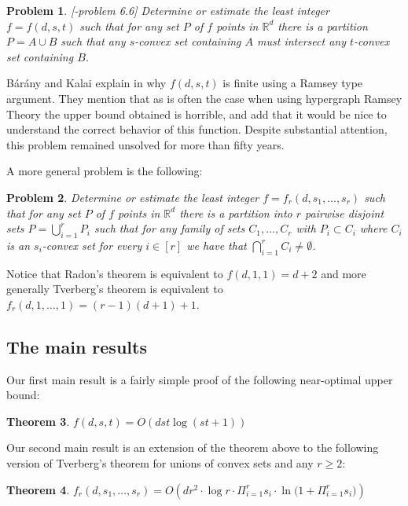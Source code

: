 \documentclass[11pt]{article}
\def\Re{\mathbb R}
\theoremstyle{plain}
\newtheorem{theorem}{Theorem}[section]
\newtheorem{problem}[theorem]{Problem}
\theoremstyle{definition}
\theoremstyle{remark}
\begin{document}
\begin{problem}\label{prob:Radon}[\cite{BaranyKalai2022}-problem 6.6]
    Determine or estimate 
	the least integer $f=f(d,s,t)$ such that for any set $P$
    of $f$ points in $\Re^d$ there is a partition $P=A \cup B$ such that
    any $s$-convex set containing $A$ must intersect any $t$-convex set
    containing $B$.
\end{problem}

B\'ar\'any and Kalai explain in \cite{BaranyKalai2022} why 
$f(d,s,t)$ is finite using a Ramsey type argument. They mention that 
as is often the case when using hypergraph Ramsey Theory
the upper bound obtained is horrible, and add that it
would be nice to understand the correct behavior of this function.
Despite substantial attention, this problem remained unsolved 
for more than fifty years.

A more general problem is the following:
\begin{problem}\label{prob:Tverberg}
    Determine or estimate
	the least integer $f=f_r(d,s_1,\ldots,s_r)$ such that for
    any set $P$ of $f$ points in $\Re^d$ there is a partition into $r$
    pairwise disjoint sets $P = \bigcup_{i=1}^r P_i$ such that for
    any family of sets $C_1,\ldots,C_r$ with $P_i \subset C_i$ where
    $C_i$ is an $s_i$-convex set for every $i \in [r]$ we have that
    $\bigcap_{i=1}^r C_i \neq \emptyset$.
\end{problem}

Notice that Radon's theorem is equivalent to 
$f(d,1,1)=d+2$ and more generally
Tverberg's theorem is equivalent to $f_r(d,1,\ldots,1) = (r-1)(d+1)+1$.

\subsection{The main results}
 
Our first main
result is a fairly simple proof of the following near-optimal upper bound:

\begin{theorem}\label{thm:main}
$f(d,s,t)=O(dst \log( st+1) )$
\end{theorem}

 Our second main result is an extension of the theorem above to the
 following version of Tverberg's theorem for unions of convex sets and
 any $r \geq 2$:
 \begin{theorem}\label{thm:main-r-partition}
     $f_r(d,s_1,\ldots,s_r)=O \left(d r^2 \cdot \log r \cdot \Pi_{i=1}^r s_i 
\cdot {\ln (1+\Pi_{i=1}^r s_i})  \right)$
 
 \end{theorem}
 
\end{document}

